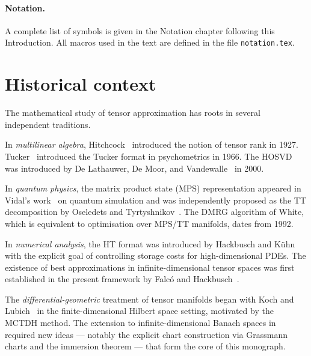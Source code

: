 \paragraph{Notation.} A complete list of symbols is given in the
Notation chapter following this Introduction. All macros used in the
text are defined in the file \texttt{notation.tex}.

\section{Historical context}
\label{sec:intro:history}

The mathematical study of tensor approximation has roots in several
independent traditions.

In \emph{multilinear algebra}, Hitchcock~\cite{Hitchcock1927} introduced
the notion of tensor rank in 1927. Tucker~\cite{Tucker1966} introduced
the Tucker format in psychometrics in 1966. The HOSVD was introduced by
De Lathauwer, De Moor, and Vandewalle~\cite{DeLathauwer2000} in 2000.

In \emph{quantum physics}, the matrix product state (MPS) representation
appeared in Vidal's work~\cite{Vidal2003} on quantum simulation and was
independently proposed as the TT decomposition by Oseledets and
Tyrtyshnikov~\cite{Oseledets2011}. The DMRG algorithm of White, which
is equivalent to optimisation over MPS/TT manifolds, dates from 1992.

In \emph{numerical analysis}, the HT format was introduced by Hackbusch
and Kühn~\cite{HaKuehn2009} with the explicit goal of controlling storage
costs for high-dimensional PDEs. The existence of best approximations
in infinite-dimensional tensor spaces was first established in the
present framework by Falcó and Hackbusch~\cite{FH2012}.

The \emph{differential-geometric} treatment of tensor manifolds began
with Koch and Lubich~\cite{KochLubich2007} in the finite-dimensional
Hilbert space setting, motivated by the MCTDH method. The extension to
infinite-dimensional Banach spaces in~\cite{FHN2019,FHN2023} required
new ideas — notably the explicit chart construction via Grassmann charts
and the immersion theorem — that form the core of this monograph.

